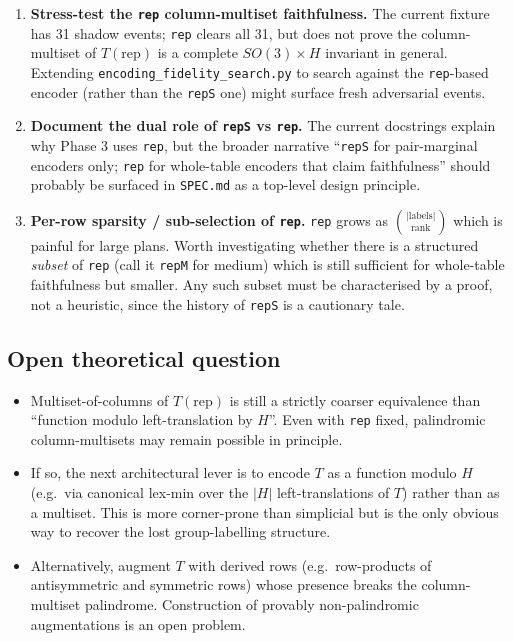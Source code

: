 \documentclass[a4paper,11pt]{article}
\begin{document}
\begin{enumerate}
  \item \textbf{Stress-test the \texttt{rep} column-multiset
        faithfulness.}  The current fixture has 31 shadow events;
        \texttt{rep} clears all 31, but does not prove the
        column-multiset of $T(\text{rep})$ is a complete $SO(3)
        \times H$ invariant in general.  Extending
        \texttt{encoding\_fidelity\_search.py} to search against the
        \texttt{rep}-based encoder (rather than the \texttt{repS}
        one) might surface fresh adversarial events.
  \item \textbf{Document the dual role of \texttt{repS} vs \texttt{rep}.}
        The current docstrings explain why Phase 3 uses \texttt{rep},
        but the broader narrative ``\texttt{repS} for pair-marginal
        encoders only; \texttt{rep} for whole-table encoders that
        claim faithfulness'' should probably be surfaced in
        \texttt{SPEC.md} as a top-level design principle.
  \item \textbf{Per-row sparsity / sub-selection of \texttt{rep}.}
        \texttt{rep} grows as $\binom{|\text{labels}|}{\text{rank}}$
        which is painful for large plans.  Worth investigating
        whether there is a structured \emph{subset} of \texttt{rep}
        (call it \texttt{repM} for medium) which is still sufficient
        for whole-table faithfulness but smaller.  Any such subset
        must be characterised by a proof, not a heuristic, since the
        history of \texttt{repS} is a cautionary tale.
\end{enumerate}

\label{sec:open-questions}
\subsection{Open theoretical question}

\begin{itemize}[nosep]
  \item Multiset-of-columns of $T(\text{rep})$ is still a strictly
        coarser equivalence than ``function modulo left-translation
        by $H$''.  Even with \texttt{rep} fixed, palindromic
        column-multisets may remain possible in principle.
  \item If so, the next architectural lever is to encode $T$ as a
        function modulo $H$ (e.g.\ via canonical lex-min over the
        $|H|$ left-translations of $T$) rather than as a multiset.
        This is more corner-prone than simplicial but is the only
        obvious way to recover the lost group-labelling structure.
  \item Alternatively, augment $T$ with derived rows
        (e.g.\ row-products of antisymmetric and symmetric rows)
        whose presence breaks the column-multiset palindrome.
        Construction of provably non-palindromic augmentations is
        an open problem.
\end{itemize}
\end{document}
